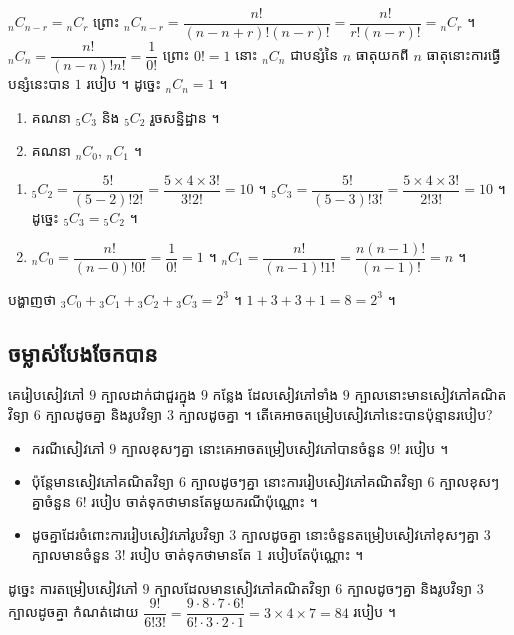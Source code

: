 \begin{example}[ឧទាហរណ៍]
${}_nC_{n-r} = {}_nC_r$ ព្រោះ ${}_nC_{n-r} = \dfrac{n!}{(n - n + r)!(n - r)!} = \dfrac{n!}{r!(n - r)!} = {}_nC_r$ ។ ${}_nC_n = \dfrac{n!}{(n - n)!n!} = \dfrac{1}{0!}$ ព្រោះ $0! = 1$ នោះ ${}_nC_n$ ជាបន្សំនៃ $n$ ធាតុយកពី $n$ ធាតុនោះការធ្វើបន្សំនេះបាន $1$ របៀប ។ ដូច្នេះ ${}_nC_n = 1$ ។
\end{example}

\begin{example}[លំហាត់គំរូ]
\begin{enumerate}[a]
  \item គណនា ${}_5C_3$ និង ${}_5C_2$ រួចសន្និដ្ឋាន ។
  \item គណនា ${}_nC_0$, ${}_nC_1$ ។
\end{enumerate}
\end{example}
\ans
\begin{enumerate}[a]
  \item ${}_5C_2 = \dfrac{5!}{(5 - 2)!2!} = \dfrac{5\times 4\times 3!}{3!2!} = 10$ ។ ${}_5C_3 = \dfrac{5!}{(5 - 3)!3!} = \dfrac{5\times 4\times 3!}{2!3!} = 10$ ។ ដូច្នេះ ${}_5C_3 = {}_5C_2$ ។
  \item ${}_nC_0 = \dfrac{n!}{(n - 0)!0!} = \dfrac{1}{0!} = 1$ ។ ${}_nC_1 = \dfrac{n!}{(n - 1)!1!} = \dfrac{n(n - 1)!}{(n - 1)!} = n$ ។
\end{enumerate}

\begin{pro}
បង្ហាញថា ${}_3C_0 + {}_3C_1 + {}_3C_2 + {}_3C_3 = 2^3$ ។
\ans
$1 + 3 + 3 + 1 = 8 = 2^3$ ។
\end{pro}

\subsection{ចម្លាស់បែងចែកបាន}

\begin{example}[ឧទាហរណ៍ ១]
គេរៀបសៀវភៅ $9$ ក្បាលដាក់ជាជួរក្នុង $9$ កន្លែង ដែលសៀវភៅទាំង $9$ ក្បាលនោះមានសៀវភៅគណិតវិទ្យា $6$ ក្បាលដូចគ្នា និងរូបវិទ្យា $3$ ក្បាលដូចគ្នា ។ តើគេអាចតម្រៀបសៀវភៅនេះបានប៉ុន្មានរបៀប?
\end{example}
\begin{itemize}
  \item ករណីសៀវភៅ $9$ ក្បាលខុសៗគ្នា នោះគេអាចតម្រៀបសៀវភៅបានចំនួន $9!$ របៀប ។
  \item ប៉ុន្តែមានសៀវភៅគណិតវិទ្យា $6$ ក្បាលដូចៗគ្នា នោះការរៀបសៀវភៅគណិតវិទ្យា $6$ ក្បាលខុសៗគ្នាចំនួន $6!$ របៀប ចាត់ទុកថាមានតែមួយករណីប៉ុណ្ណោះ ។
  \item ដូចគ្នាដែរចំពោះការរៀបសៀវភៅរូបវិទ្យា $3$ ក្បាលដូចគ្នា នោះចំនួនតម្រៀបសៀវភៅខុសៗគ្នា $3$ ក្បាលមានចំនួន $3!$ របៀប ចាត់ទុកថាមានតែ $1$ របៀបតែប៉ុណ្ណោះ ។
\end{itemize}
ដូច្នេះ ការតម្រៀបសៀវភៅ $9$ ក្បាលដែលមានសៀវភៅគណិតវិទ្យា $6$ ក្បាលដូចៗគ្នា និងរូបវិទ្យា $3$ ក្បាលដូចគ្នា កំណត់ដោយ $\dfrac{9!}{6!3!} = \dfrac{9\cdot 8\cdot 7\cdot 6!}{6!\cdot 3\cdot 2\cdot 1} = 3\times 4\times 7 = 84$ របៀប ។

